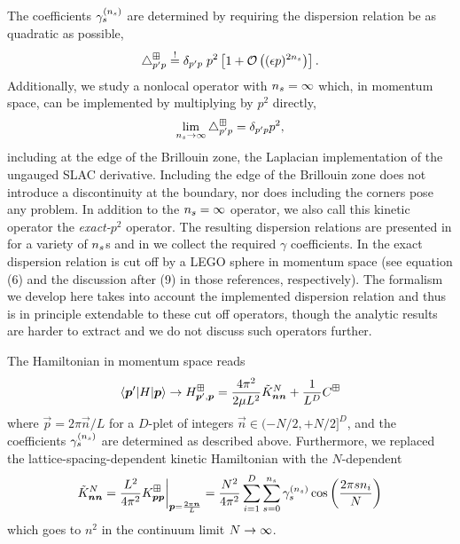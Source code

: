 The coefficients $\gamma_{s}^{({n_s})}$ are determined by requiring the dispersion relation be as quadratic as possible,
\begin{equation}
    \label{eq:gamma determination}
    \mathop{}\!\mathbin\bigtriangleup^\boxplus_{p'p}
    \overset{!}{=}
    \delta_{p'p} \;
    p^2 \left[
        1 + \mathcal{O}\left((\epsilon p)^{2{n_s}}\right)
    \right].
\end{equation}
Additionally, we study a nonlocal operator with ${n_s}=\infty$ which, in momentum space, can be implemented by multiplying by $p^2$ directly,
\begin{equation}
    \lim\limits_{n_s \to \infty}
    \mathop{}\!\mathbin\bigtriangleup^\boxplus_{p'p}
    =
    \delta_{p'p} p^2,
\end{equation}
including at the edge of the Brillouin zone, the Laplacian implementation of the ungauged SLAC derivative.
Including the edge of the Brillouin zone does not introduce a discontinuity at the boundary, nor does including the corners pose any problem.
In addition to the ${n_s}=\infty$ operator, we also call this kinetic operator the \emph{exact-$p^2$} operator.
The resulting dispersion relations are presented in  for a variety of ${n_s}$s and in  we collect the required $\gamma$ coefficients.
In  the exact dispersion relation is cut off by a LEGO sphere in momentum space (see equation (6) and the discussion after (9) in those references, respectively).
The formalism we develop here takes into account the implemented dispersion relation and thus is in principle extendable to these cut off operators, though the analytic results are harder to extract and we do not discuss such operators further.

The Hamiltonian in momentum space reads
\begin{equation}
    \label{eq:p space hamiltonian}
    \left\langle \boldsymbol{p}' \middle| H \middle| \boldsymbol{p} \right\rangle
    \rightarrow
    H_{\boldsymbol{p}',\boldsymbol{p}}^\boxplus
    =
    \frac{4 \pi^2}{2\mu L^2} \tilde K_{\boldsymbol{n} \boldsymbol{n}}^{N}
    +\frac{1}{L^D}C^\boxplus
\end{equation}
where $\vec{p} = 2\pi \vec{n}/L$ for a $D$-plet of integers $\vec{n} \in (-N/2, +N/2]^D$, and the coefficients $\gamma_{s}^{({n_s})}$ are determined as described above.
Furthermore, we replaced the lattice-spacing-dependent kinetic Hamiltonian with the $N$-dependent
\begin{equation}\label{eq:normalized-kinetic-hamitlonian}
	\tilde K_{\boldsymbol{n} \boldsymbol{n}}^{N}
	= \frac{L^2}{4\pi^2} K_{\boldsymbol{p} \boldsymbol{p}}^{\boxplus} \bigg|_{\boldsymbol{p}=\frac{2\pi \boldsymbol{n}}{L}}
	= \frac{N^2}{4\pi^2}
    \sum_{i=1}^{D}\sum_{s=0}^{{n_s}} \gamma_s^{({n_s})} \cos\left(\frac{2 \pi s n_i}{N}\right)
\end{equation}
which goes to $n^2$ in the continuum limit $N\rightarrow\infty$.

